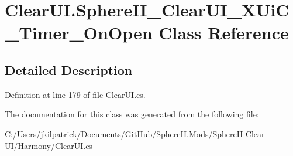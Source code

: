 \hypertarget{class_clear_u_i_1_1_sphere_i_i___clear_u_i___x_ui_c___timer___on_open}{}\section{Clear\+U\+I.\+Sphere\+I\+I\+\_\+\+Clear\+U\+I\+\_\+\+X\+Ui\+C\+\_\+\+Timer\+\_\+\+On\+Open Class Reference}
\label{class_clear_u_i_1_1_sphere_i_i___clear_u_i___x_ui_c___timer___on_open}


\subsection{Detailed Description}


Definition at line 179 of file Clear\+U\+I.\+cs.



The documentation for this class was generated from the following file\+:\begin{DoxyCompactItemize}
\item 
C\+:/\+Users/jkilpatrick/\+Documents/\+Git\+Hub/\+Sphere\+I\+I.\+Mods/\+Sphere\+I\+I Clear U\+I/\+Harmony/\mbox{\hyperlink{_clear_u_i_8cs}{Clear\+U\+I.\+cs}}\end{DoxyCompactItemize}
